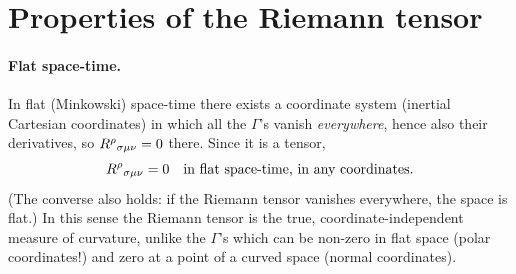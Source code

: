 \section{Properties of the Riemann tensor}

\paragraph{Flat space-time.} In flat (Minkowski) space-time there exists a coordinate system (inertial Cartesian coordinates) in which all the $\Gamma$'s vanish \emph{everywhere}, hence also their derivatives, so $R^{\rho}{}_{\sigma\mu\nu}=0$ there. Since it is a tensor,
\begin{equation}
  R^{\rho}{}_{\sigma\mu\nu}=0\quad\text{in flat space-time, in any coordinates.}
\end{equation}
(The converse also holds: if the Riemann tensor vanishes everywhere, the space is flat.) In this sense the Riemann tensor is the true, coordinate-independent measure of curvature, unlike the $\Gamma$'s which can be non-zero in flat space (polar coordinates!) and zero at a point of a curved space (normal coordinates).

